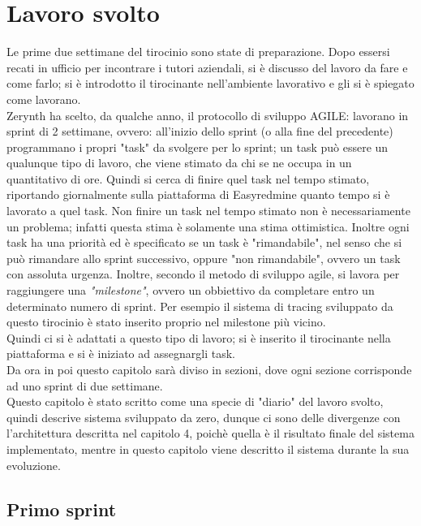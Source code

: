 \documentclass[a4paper,12pt,titlepage,italian,openany]{report}
\begin{document}
\chapter{Lavoro svolto}
Le prime due settimane del tirocinio sono state di preparazione. Dopo essersi recati in ufficio per incontrare i tutori aziendali, si è discusso
del lavoro da fare e come farlo; si è introdotto il tirocinante nell'ambiente lavorativo e gli si è spiegato come lavorano.\\
Zerynth ha scelto, da qualche anno, il protocollo di sviluppo AGILE: lavorano in sprint di 2 settimane, ovvero: all'inizio dello sprint (o alla fine del precedente) programmano i propri "task" da svolgere per lo sprint; un task può essere un qualunque tipo di lavoro, che viene stimato da chi se ne occupa in un quantitativo di ore. Quindi si cerca di finire quel task nel tempo stimato, riportando giornalmente sulla piattaforma di Easyredmine\cite{easyredmine:1} quanto tempo si è lavorato a quel task.
Non finire un task nel tempo stimato non è necessariamente un problema; infatti questa stima è solamente una stima ottimistica. Inoltre ogni task ha una priorità ed è specificato se un task è "rimandabile", nel senso che si può rimandare allo sprint successivo, oppure "non rimandabile", ovvero un task con assoluta urgenza. Inoltre, secondo il metodo di sviluppo agile,  si lavora per raggiungere una \textit{"milestone"}, ovvero un obbiettivo da completare entro un determinato numero di sprint. Per esempio il sistema di tracing sviluppato da questo tirocinio è stato inserito proprio nel milestone più  vicino.\\
Quindi ci si è adattati a questo tipo di lavoro; si è inserito il tirocinante nella piattaforma e si è iniziato ad assegnargli task.\\
Da ora in poi questo capitolo sarà diviso in sezioni, dove ogni sezione corrisponde ad uno sprint di due settimane.
\\Questo capitolo è stato scritto come una specie di "diario" del lavoro svolto, quindi descrive sistema sviluppato da zero, dunque ci sono delle divergenze con l'architettura descritta nel capitolo 4, poichè quella è il risultato finale del sistema implementato, mentre in questo capitolo viene descritto il sistema durante la sua evoluzione.
\section{Primo sprint}
\end{document}
